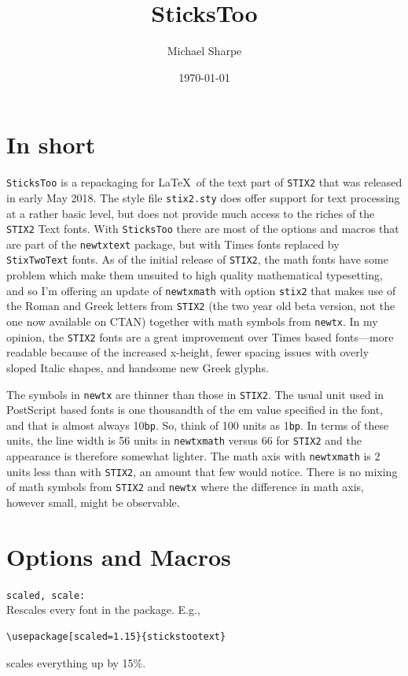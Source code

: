 \documentclass[11pt]{article}
\title{SticksToo}
\author{Michael Sharpe}
\date{\today}  %
\begin{document}
\maketitle

\section{In short}
{\tt SticksToo} is a repackaging for \LaTeX\ of the text part of {\tt STIX2} that was released in early May 2018. The style file {\tt stix2.sty} does offer support for text processing at a rather basic level, but does not provide much access to the riches of the {\tt STIX2} Text fonts. With 
{\tt SticksToo} there are most of the options and macros that are part of the {\tt newtxtext} package, but with Times fonts replaced by {\tt StixTwoText} fonts. As of the initial release of {\tt STIX2}, the math fonts have some problem which make them unsuited to high quality mathematical typesetting, and so I'm offering an update of {\tt newtxmath} with option {\tt stix2} that makes use of the Roman and Greek letters from {\tt STIX2} (the two year old beta version, not the one now available on CTAN)
together with math symbols from {\tt newtx}. In my opinion, the {\tt STIX2} fonts are a great improvement over Times based fonts---more readable because of the increased x-height, fewer spacing issues with overly sloped Italic shapes, and  handsome new Greek glyphs.

The symbols in {\tt newtx} are thinner than those in {\tt STIX2}. The usual unit used in PostScript based fonts is one thousandth of the {em} value specified in the font, and that is almost always 10{\tt bp}. So, think of 100 units as 1{\tt bp}. In terms of these units, the line width is 56 units in {\tt newtxmath} versus 66 for {\tt STIX2} and the appearance is therefore somewhat lighter. The math axis with {\tt newtxmath} is 2 units less than with {\tt STIX2}, an amount that few would notice. There is no mixing of 
math symbols from {\tt STIX2}  and {\tt newtx}  where the difference in math axis, however small, might be observable.
\section{Options and Macros}
{\tt scaled, scale:}\\
Rescales every font in the package. E.g.,
\begin{verbatim}
\usepackage[scaled=1.15}{stickstootext}
\end{verbatim}
scales everything up by 15\%.
\end{document}
